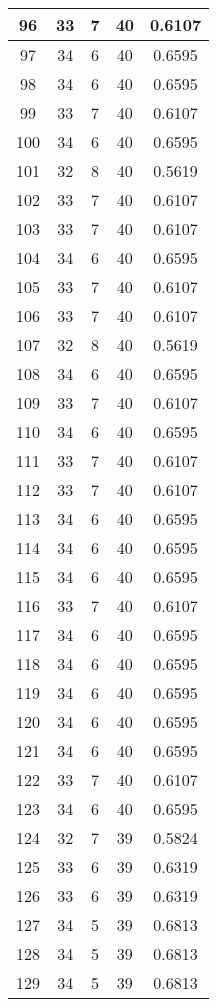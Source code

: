 \documentclass[letterpaper, 12pt]{article}
\begin{document}
\begin{longtable}{|c|c|c|c|c|}
\hline
96 & 33 & 7 & 40 & 0.6107 \\
\hline
97 & 34 & 6 & 40 & 0.6595 \\
\hline
98 & 34 & 6 & 40 & 0.6595 \\
\hline
99 & 33 & 7 & 40 & 0.6107 \\
\hline
100 & 34 & 6 & 40 & 0.6595 \\
\hline
101 & 32 & 8 & 40 & 0.5619 \\
\hline
102 & 33 & 7 & 40 & 0.6107 \\
\hline
103 & 33 & 7 & 40 & 0.6107 \\
\hline
104 & 34 & 6 & 40 & 0.6595 \\
\hline
105 & 33 & 7 & 40 & 0.6107 \\
\hline
106 & 33 & 7 & 40 & 0.6107 \\
\hline
107 & 32 & 8 & 40 & 0.5619 \\
\hline
108 & 34 & 6 & 40 & 0.6595 \\
\hline
109 & 33 & 7 & 40 & 0.6107 \\
\hline
110 & 34 & 6 & 40 & 0.6595 \\
\hline
111 & 33 & 7 & 40 & 0.6107 \\
\hline
112 & 33 & 7 & 40 & 0.6107 \\
\hline
113 & 34 & 6 & 40 & 0.6595 \\
\hline
114 & 34 & 6 & 40 & 0.6595 \\
\hline
115 & 34 & 6 & 40 & 0.6595 \\
\hline
116 & 33 & 7 & 40 & 0.6107 \\
\hline
117 & 34 & 6 & 40 & 0.6595 \\
\hline
118 & 34 & 6 & 40 & 0.6595 \\
\hline
119 & 34 & 6 & 40 & 0.6595 \\
\hline
120 & 34 & 6 & 40 & 0.6595 \\
\hline
121 & 34 & 6 & 40 & 0.6595 \\
\hline
122 & 33 & 7 & 40 & 0.6107 \\
\hline
123 & 34 & 6 & 40 & 0.6595 \\
\hline
124 & 32 & 7 & 39 & 0.5824 \\
\hline
125 & 33 & 6 & 39 & 0.6319 \\
\hline
126 & 33 & 6 & 39 & 0.6319 \\
\hline
127 & 34 & 5 & 39 & 0.6813 \\
\hline
128 & 34 & 5 & 39 & 0.6813 \\
\hline
129 & 34 & 5 & 39 & 0.6813 \\

\end{longtable}
\end{document}
